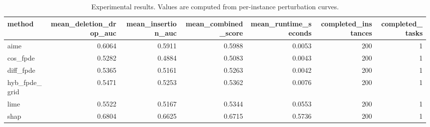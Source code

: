 \begin{table}[t]
\caption{Experimental results. Values are computed from per-instance perturbation curves.}
\label{tab:main_results_computed}
\centering
\begin{tabular}{lrrrrrr}
\toprule
method & mean\_deletion\_drop\_auc & mean\_insertion\_auc & mean\_combined\_score & mean\_runtime\_seconds & completed\_instances & completed\_tasks \\
\midrule
aime & 0.6064 & 0.5911 & 0.5988 & 0.0053 & 200 & 1 \\
cos\_fpde & 0.5282 & 0.4884 & 0.5083 & 0.0043 & 200 & 1 \\
diff\_fpde & 0.5365 & 0.5161 & 0.5263 & 0.0042 & 200 & 1 \\
hyb\_fpde\_grid & 0.5471 & 0.5253 & 0.5362 & 0.0076 & 200 & 1 \\
lime & 0.5522 & 0.5167 & 0.5344 & 0.0553 & 200 & 1 \\
shap & 0.6804 & 0.6625 & 0.6715 & 0.5736 & 200 & 1 \\
\bottomrule
\end{tabular}

\end{table}
